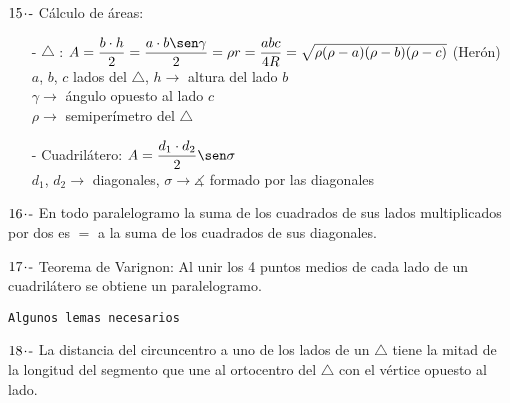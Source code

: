$ 15\hspace{-0.05cm}\cdot\hspace{-0.05cm}\text{-} $ Cálculo de áreas:
\begin{itemize}
    \item[-] $\triangle$ : $A = \dfrac{b\cdot h}{2}= \dfrac{a\cdot b \sen \gamma}{2} = \rho r = \dfrac{abc}{4R} = \sqrt{\rho(\rho-a)(\rho-b)(\rho-c)}$ (Herón)\vspace{0.4cm}\\
    $a$, $b$, $c$ lados del $\triangle$, $h \rightarrow$ altura del lado $b$\\
    $\gamma \rightarrow$ ángulo opuesto al lado $c$\\
    $\rho \rightarrow$ semiperímetro del $\triangle$
    
    \item[-] Cuadrilátero: $A = \dfrac{d_1 \cdot d_2}{2} \sen \sigma $\vspace{0.4cm}\\
    $d_1$, $d_2 \rightarrow$ diagonales, \hspace{0.5cm}$\sigma \rightarrow \measuredangle$ formado por las diagonales
\end{itemize}

\vspace{0.5cm}

$ 16\hspace{-0.05cm}\cdot\hspace{-0.05cm}\text{-} $  En todo paralelogramo la suma de los cuadrados de sus lados multiplicados por dos es $=$ a la suma de los cuadrados de sus diagonales.

\vspace{0.5cm}

$ 17\hspace{-0.05cm}\cdot\hspace{-0.05cm}\text{-} $ Teorema de Varignon: Al unir los 4 puntos medios de cada lado de un cuadrilátero se obtiene un paralelogramo.

\newpage

\begin{center}
    \texttt{Algunos lemas necesarios}
\end{center}

$ 18\hspace{-0.05cm}\cdot\hspace{-0.05cm}\text{-} $  La distancia del circuncentro a uno de los lados de un $\triangle$ tiene la mitad de la longitud del segmento que une al ortocentro del $\triangle$ con el vértice opuesto al lado.


